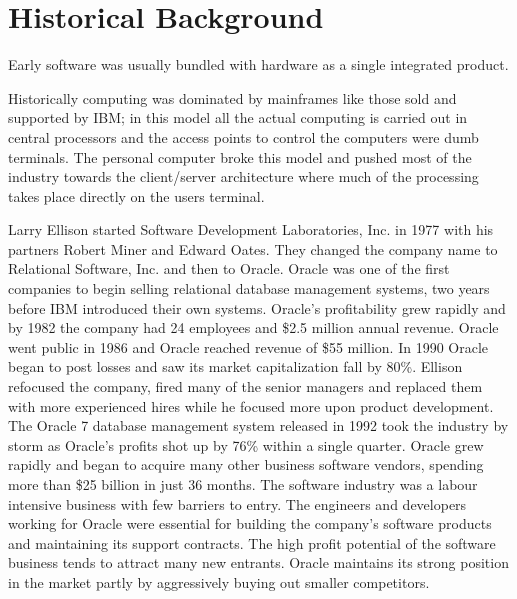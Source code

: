 \section*{Historical Background}

Early software was usually bundled with hardware as a single integrated product.\autocite[4]{buxmann2012software}

Historically computing was dominated by mainframes like those sold and supported by IBM; in this model all the actual computing is carried out in central processors and the access points to control the computers were dumb terminals.\autocite[]{LargeParadigmShiftCloudComputing}
The personal computer broke this model and pushed most of the industry towards the client/server architecture where much of the processing takes place directly on the users terminal.\autocite[]{LargeParadigmShiftCloudComputing}


Larry Ellison started Software Development Laboratories, Inc. in 1977 with his partners Robert Miner and Edward Oates.\autocite[113]{finkle2012larry}
They changed the company name to Relational Software, Inc. and then to Oracle.\autocite[113]{finkle2012larry}
Oracle was one of the first companies to begin selling relational database management systems, two years before IBM introduced their own systems.\autocite[113]{finkle2012larry}
Oracle's profitability grew rapidly and by 1982 the company had 24 employees and \$2.5 million annual revenue.\autocite[113]{finkle2012larry}
Oracle went public in 1986 and Oracle reached revenue of \$55 million.\autocite[113]{finkle2012larry}
In 1990 Oracle began to post losses and saw its market capitalization fall by 80\%.\autocite[113]{finkle2012larry}
Ellison refocused the company, fired many of the senior managers and replaced them with more experienced hires while he focused more upon product development.\autocite[113]{finkle2012larry}
The Oracle 7 database management system released in 1992 took the industry by storm as Oracle's profits shot up by 76\% within a single quarter.\autocite[114]{finkle2012larry}
Oracle grew rapidly and began to acquire many other business software vendors, spending more than \$25 billion in just 36 months.\autocite[114]{finkle2012larry}
The software industry was a labour intensive business with few barriers to entry.\autocite[115]{finkle2012larry}
The engineers and developers working for Oracle were essential for building the company's software products and maintaining its support contracts.\autocite[115]{finkle2012larry}
The high profit potential of the software business tends to attract many new entrants.\autocite[]{finkle2012larry}
Oracle maintains its strong position in the market partly by aggressively buying out smaller competitors.\autocite[]{finkle2012larry}


